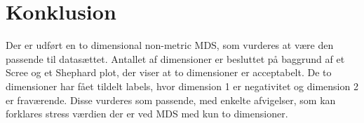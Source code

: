 \section*{Konklusion}
\label{Konklusion}
%
Der er udført en to dimensional non-metric MDS, som vurderes at være den passende til datasættet. Antallet af dimensioner er besluttet på baggrund af et Scree og et Shephard plot, der viser at to dimensioner er acceptabelt. De to dimensioner har fået tildelt labels, hvor dimension 1 er negativitet og dimension 2 er fraværende. Disse vurderes som passende, med enkelte afvigelser, som kan forklares stress værdien der er ved MDS med kun to dimensioner. 